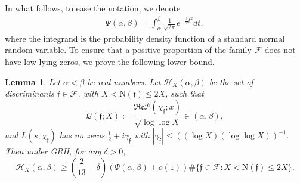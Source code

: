 \documentclass[11pt]{amsart}
\newcommand{\norm}{\mathrm{N}}
\newtheorem{lemma}[prop]{Lemma}
\numberwithin{equation}{section}
\renewcommand{\Re}{{\mathfrak{Re}}}
\theoremstyle{remark}
\begin{document}
In what follows, to ease the notation, we denote
\begin{align*}
\Psi(\alpha,\beta) 
=
\int_\alpha^\beta \frac{1}{\sqrt{ 2\pi}}e^{-\frac{1}{2} t^2} dt,
\end{align*}
where the integrand is the probability density function of a standard normal random variable. 
To ensure that a positive proportion of the family $\mathcal{F}$ does not have low-lying zeros, we prove the following lower bound. 

\begin{lemma}\label{dist-lemma} 
Let $\alpha<\beta$ be real numbers. Let $\mathcal{H}_X(\alpha,\beta)$ be the set of discriminants $\mathfrak{f} \in\mathcal{F}$, with  $X < \norm(\mathfrak{f}) \le 2X$, such that
$$
\mathcal{Q}(\mathfrak{f};X) := \frac{\Re \mathcal{P}(\chi_\mathfrak{f}; x)   }{\sqrt{ \log \log X}}\in (\alpha,\beta) , 
$$
and $ L(s,\chi_{\mathfrak{f}})$ has no zeros $\frac{1}{2}+i\gamma_\mathfrak{f}$ with
$
 |\gamma_\mathfrak{f}|  \le( (\log X) (\log\log X))^{-1}.
$
Then under GRH, for any $\delta>0$, 
$$
\mathcal{H}_X(\alpha,\beta) 
\ge
\left(\frac{2}{13}-\delta\right)
( \Psi(\alpha,\beta) +o(1) )
\# \{ \mathfrak{f} \in\mathcal{F} :  X < \norm(\mathfrak{f}) \le 2X \}.
$$
\end{lemma}
\end{document}
